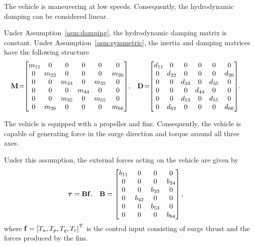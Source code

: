 \begin{asm}
    \label{asm:damping}
    The vehicle is maneuvering at low speeds.
    Consequently, the hydrodynamic damping can be considered linear.
\end{asm}

\noindent Under Assumption~\ref{asm:damping}, the hydrodynamic damping matrix is constant.
Under Assumption~\ref{asm:symmetric}, the inertia and damping matrices have the following structure
\begin{align}
    \mat{M}\! &= \!\!
    \begin{bmatrix}
        m_{11}\!\! & 0 & 0 & 0 & 0 & 0\\ 0 & \!m_{22}\! & 0 & 0 & 0 & m_{26}\\ 0 & 0 & \!m_{33}\! & 0 & \!m_{35}\! & 0\\ 0 & 0 & 0 & \!m_{44}\! & 0 & 0\\ 0 & 0 & \!m_{35}\! & 0 & \!m_{55}\! & 0\\ 0 & \!m_{26}\! & 0 & 0 & 0 & m_{66}
    \end{bmatrix}\!, &
    \mat{D}\! &= \!\!
    \begin{bmatrix}
        d_{11}\!\! & 0 & 0 & 0 & 0 & 0\\ 0 & \!d_{22}\! & 0 & 0 & 0 & d_{26}\\ 0 & 0 & \!d_{33}\! & 0 & \!d_{35}\! & 0\\ 0 & 0 & 0 & \!d_{44}\! & 0 & 0\\ 0 & 0 & \!d_{53}\! & 0 & \!d_{55}\! & 0\\ 0 & \!d_{62}\! & 0 & 0 & 0 & d_{66}
    \end{bmatrix}\!.
\end{align}

\begin{asm}
    \label{asm:actuators}
    The vehicle is equipped with a propeller and fins.
    Consequently, the vehicle is capable of generating force in the surge direction and torque around all three axes.
\end{asm}
Under this assumption, the external forces acting on the vehicle are given by
\begin{align}
    \bm{\tau} &= \mathbf{B}\mathbf{f}, &
    \mathbf{B} &= 
    \begin{bmatrix}
        b_{11} & 0 & 0 & 0 \\ 0 & 0 & 0 & b_{24} \\ 0 & 0 & b_{33} & 0 \\ 0 & b_{42} & 0 & 0 \\ 0 & 0 & b_{53} & 0 \\ 0 & 0 & 0 & b_{64}
    \end{bmatrix},
\end{align}
where $\mathbf{f} = \left[T_u, T_p, T_q, T_r\right]^{\mathrm{T}}$ is the control input consisting of surge thrust and the forces produced by the fins.

